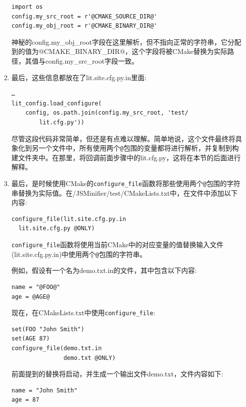 \begin{enumerate}
\begin{lstlisting}[style=stylePython]
import os
config.my_src_root = r'@CMAKE_SOURCE_DIR@'
config.my_obj_root = r'@CMAKE_BINARY_DIR@'
\end{lstlisting}

神秘的config.my\_obj\_root字段在这里解析，但不指向正常的字符串，它分配到的值为@CMAKE\_BINARY\_DIR@，这个字段将被CMake替换为实际路径，其值与config.my\_src\_root字段一致。

\item 最后，这些信息都放在了lit.site.cfg.py.in里面:

\begin{lstlisting}[style=stylePython]
…
lit_config.load_configure(
	config, os.path.join(config.my_src_root, 'test/
		lit.cfg.py'))
\end{lstlisting}

尽管这段代码非常简单，但还是有点难以理解。简单地说，这个文件最终将具象化到另一个文件中，所有使用两个\texttt{@}包围的变量都将进行解析，并复制到构建文件夹中。在那里，将回调前面步骤中的lit.cfg.py，这将在本节的后面进行解释。

\item 最后，是时候使用CMake的\texttt{configure\_file}函数将那些使用两个\texttt{@}包围的字符串替换为实际值。在/JSMinifier/test/CMakeLists.txt中，在文件中添加以下内容:

\begin{lstlisting}[style=styleCMake]
configure_file(lit.site.cfg.py.in
  lit.site.cfg.py @ONLY)
\end{lstlisting}

\texttt{configure\_file}函数将使用当前CMake中的对应变量的值替换输入文件(lit.site.cfg.py.in)中使用两个\texttt{@}包围的字符串。

例如，假设有一个名为demo.txt.in的文件，其中包含以下内容:

\begin{lstlisting}[style=styleCMake]
name = "@FOO@"
age = @AGE@
\end{lstlisting}

现在，在CMakeLists.txt中使用\texttt{configure\_file}:

\begin{lstlisting}[style=styleCMake]
set(FOO "John Smith")
set(AGE 87)
configure_file(demo.txt.in
			   demo.txt @ONLY)
\end{lstlisting}

前面提到的替换将启动，并生成一个输出文件demo.txt，文件内容如下:

\begin{lstlisting}[style=styleCMake]
name = "John Smith"
age = 87
\end{lstlisting}


\end{enumerate}
